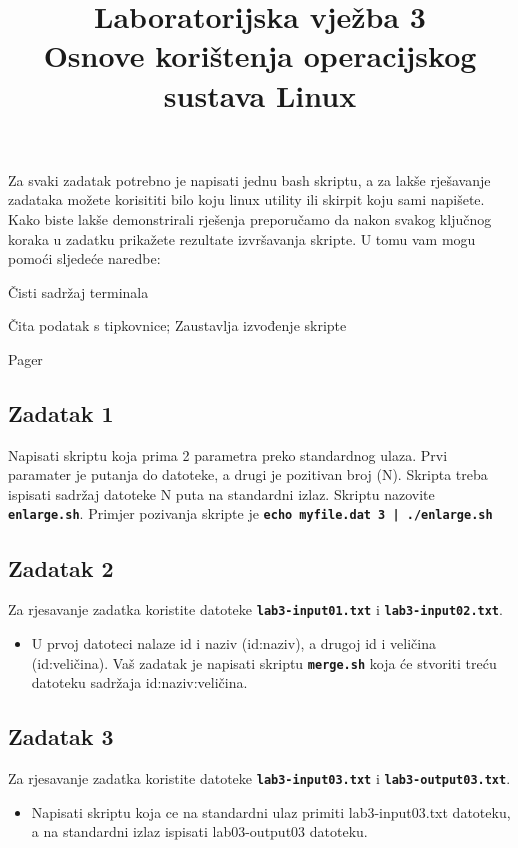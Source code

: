 \documentclass[12pt,a4paper]{article}
\newcommand{\shell}[1]{\texttt{\textbf{#1}}}
\begin{document}
	\title{Laboratorijska vježba 3\\{\small Osnove korištenja operacijskog sustava Linux}\vspace{-2em}}
	\maketitle
	Za svaki zadatak potrebno je napisati jednu bash skriptu, a za lakše rješavanje zadataka možete korisititi bilo koju linux utility ili skirpit koju sami napišete. Kako biste lakše demonstrirali rješenja preporučamo da nakon svakog ključnog koraka u zadatku prikažete rezultate izvršavanja skripte. U tomu vam mogu pomoći sljedeće naredbe:
	\begin{description}[leftmargin=!,labelwidth=4em,itemsep=0em]
		\item[\shell{clear}] Čisti sadržaj terminala
		\item[\shell{read -p}] Čita podatak s tipkovnice; Zaustavlja izvođenje skripte
		\item[\shell{less}] Pager
	\end{description}
	
  \subsection*{Zadatak 1}
  Napisati skriptu koja prima 2 parametra preko standardnog ulaza. Prvi paramater je putanja do datoteke, a drugi je pozitivan broj (N).
  Skripta treba ispisati sadržaj datoteke N puta na standardni izlaz. Skriptu nazovite \shell{enlarge.sh}. Primjer pozivanja skripte je \shell{echo myfile.dat 3 | ./enlarge.sh}

	\subsection*{Zadatak 2}
  Za rjesavanje zadatka koristite datoteke \shell{lab3-input01.txt} i \shell{lab3-input02.txt}.
	\begin{itemize}
    \item U prvoj datoteci nalaze id i naziv (id:naziv), a drugoj id i veličina (id:veličina). Vaš zadatak je napisati skriptu \shell{merge.sh} koja će stvoriti treću datoteku sadržaja id:naziv:veličina.
	\end{itemize}
	
	\subsection*{Zadatak 3}
  Za rjesavanje zadatka koristite datoteke \shell{lab3-input03.txt} i \shell{lab3-output03.txt}.
	\begin{itemize}
		\item Napisati skriptu koja ce na standardni ulaz primiti lab3-input03.txt datoteku, a na standardni izlaz ispisati lab03-output03 datoteku.
	\end{itemize}
	
\end{document}
